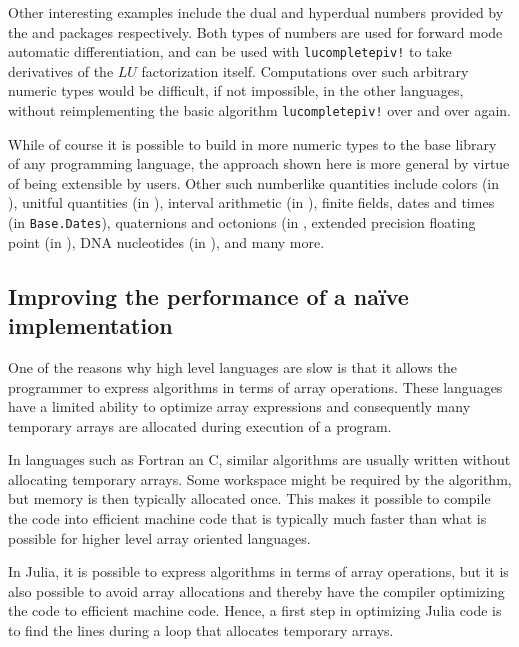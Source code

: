 Other interesting examples include the dual and hyperdual numbers provided by
the  and  packages
respectively. Both types of numbers are used for forward mode automatic
differentiation, and can be used with \lstinline|lucompletepiv!| to take
derivatives of the $LU$ factorization itself. Computations over such arbitrary
numeric types would be difficult, if not impossible, in the other languages,
without reimplementing the basic algorithm \lstinline|lucompletepiv!| over and
over again.

While of course it is possible to build in more numeric types to the base
library of any programming language, the approach shown here is more general
by virtue of being extensible by users. Other such numberlike quantities
include colors (in ), unitful quantities (in
), interval arithmetic (in ),
finite fields, dates and times (in \lstinline|Base.Dates|), quaternions and
octonions (in , extended precision floating point (in
), DNA nucleotides (in ), and many
more.



\subsection{Improving the performance of a na\"ive implementation}
One of the reasons why high level languages are slow is that it allows the programmer to express algorithms in terms of array operations. These languages have a limited ability to optimize array expressions and consequently many temporary arrays are allocated during execution of a program.

In languages such as Fortran an C, similar algorithms are usually written without allocating temporary arrays. Some workspace might be required by the algorithm, but memory is then typically allocated once. This makes it possible to compile the code into efficient machine code that is typically much faster than what is possible for higher level array oriented languages.

In Julia, it is possible to express algorithms in terms of array operations, but it is also possible to avoid array allocations and thereby have the compiler optimizing the code to efficient machine code. Hence, a first step in optimizing Julia code is to find the lines during a loop that allocates temporary arrays.

